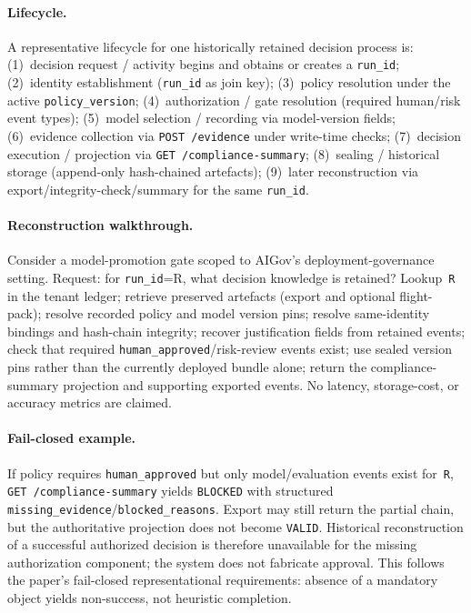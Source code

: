 \documentclass[11pt,a4paper]{article}
\begin{document}
\paragraph{Lifecycle.}
A representative lifecycle for one historically retained decision process is: (1)~decision request / activity begins and obtains or creates a \texttt{run\_id}; (2)~identity establishment (\texttt{run\_id} as join key); (3)~policy resolution under the active \texttt{policy\_version}; (4)~authorization / gate resolution (required human/risk event types); (5)~model selection / recording via model-version fields; (6)~evidence collection via \texttt{POST /evidence} under write-time checks; (7)~decision execution / projection via \texttt{GET /compliance-summary}; (8)~sealing / historical storage (append-only hash-chained artefacts); (9)~later reconstruction via export/integrity-check/summary for the same \texttt{run\_id}.

\paragraph{Reconstruction walkthrough.}
Consider a model-promotion gate scoped to AIGov's deployment-governance setting. Request: for \texttt{run\_id}=R, what decision knowledge is retained? Lookup~\texttt{R} in the tenant ledger; retrieve preserved artefacts (export and optional flight-pack); resolve recorded policy and model version pins; resolve same-identity bindings and hash-chain integrity; recover justification fields from retained events; check that required \texttt{human\_approved}/risk-review events exist; use sealed version pins rather than the currently deployed bundle alone; return the compliance-summary projection and supporting exported events. No latency, storage-cost, or accuracy metrics are claimed.

\paragraph{Fail-closed example.}
If policy requires \texttt{human\_approved} but only model/evaluation events exist for~\texttt{R}, \texttt{GET /compliance-summary} yields \texttt{BLOCKED} with structured \texttt{missing\_evidence}/\texttt{blocked\_reasons}. Export may still return the partial chain, but the authoritative projection does not become \texttt{VALID}. Historical reconstruction of a successful authorized decision is therefore unavailable for the missing authorization component; the system does not fabricate approval. This follows the paper's fail-closed representational requirements: absence of a mandatory object yields non-success, not heuristic completion.
\end{document}
